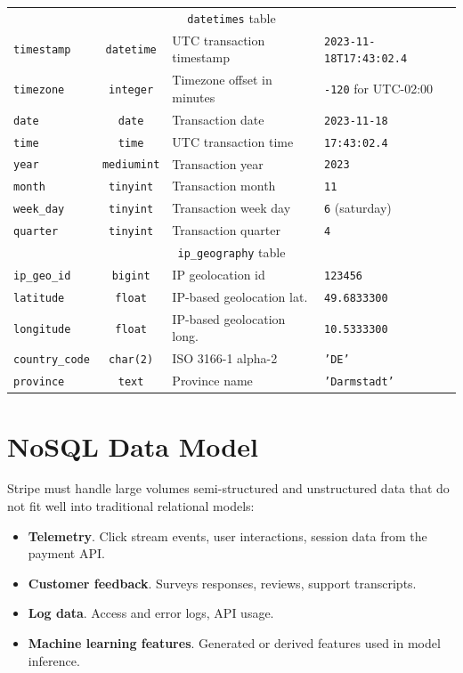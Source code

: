 \documentclass[11pt,a4paper,computermodern]{article}
\newcommand{\code}{\texttt}
\begin{document}
\begin{table}[!htb]
\begin{threeparttable}
\begin{tabularx}{0.99\textwidth}{l c >{\arraybackslash}X >{\arraybackslash}X}
			\midrule
			\multicolumn{4}{c}{\code{datetimes} table}\\
			\code{timestamp} & \code{datetime} & UTC transaction timestamp & \code{2023-11-18T17:43:02.4} \\
			\code{timezone} & \code{integer} & Timezone offset in minutes & \code{-120} for UTC-02:00 \\
			\code{date} & \code{date} & Transaction date & \code{2023-11-18} \\
			\code{time} & \code{time} & UTC transaction time & \code{17:43:02.4} \\
			\code{year} & \code{mediumint} & Transaction year & \code{2023} \\
			\code{month} & \code{tinyint} & Transaction month & \code{11} \\
			\code{week\_day} & \code{tinyint} & Transaction week day & \code{6} (saturday) \\
			\code{quarter} & \code{tinyint} & Transaction quarter & \code{4} \\
			
			\midrule
			\multicolumn{4}{c}{\code{ip\_geography} table}\\
			\code{ip\_geo\_id} & \code{bigint} & IP geolocation id & \code{123456} \\
			\code{latitude} & \code{float} & IP-based geolocation lat. & \code{49.6833300} \\
			\code{longitude} & \code{float} & IP-based geolocation long. & \code{10.5333300} \\
			\code{country\_code} & \code{char(2)} & ISO 3166-1 alpha-2 & \code{'DE'} \\
			\code{province} & \code{text} & Province name & \code{'Darmstadt'} \\
			
			\bottomrule
		\end{tabularx}
	\end{threeparttable}
\end{table}


\clearpage
\section*{NoSQL Data Model}

Stripe must handle large volumes semi-structured and unstructured data that do not fit well into traditional relational models:
\begin{itemize}[itemsep=5pt, parsep=0pt]
	\item \textbf{Telemetry}. Click stream events, user interactions, session data from the payment API.
	\item \textbf{Customer feedback}. Surveys responses, reviews, support transcripts.
	\item \textbf{Log data}. Access and error logs, API usage.
	\item \textbf{Machine learning features}. Generated or derived features used in model inference.
\end{itemize}
\end{document}
